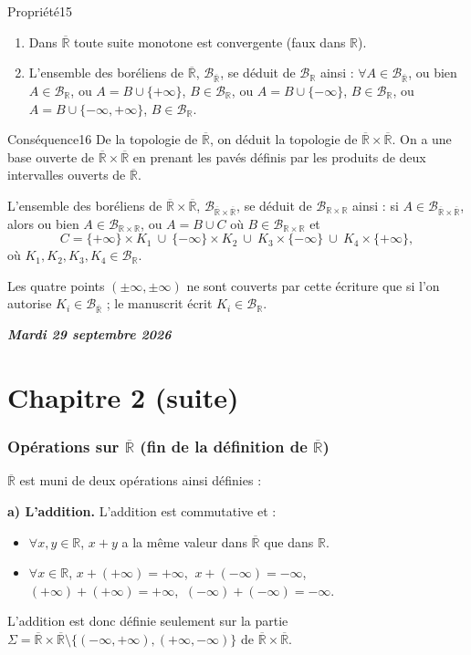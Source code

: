 \documentclass[11pt,a4paper]{article}
\newcommand{\R}{\mathbb{R}}
\newcommand{\Rb}{\overline{\mathbb{R}}}
\newcommand{\B}{\mathscr{B}}
\newcommand{\datepage}[1]{\begin{flushright}\small\bfseries\itshape\color{bleuclair}#1\end{flushright}\vspace{-8pt}}
\begin{document}
\begin{enonce}{Propriété}{15}
\begin{enumerate}[label=\textbf{\arabic*.},leftmargin=1.2cm]
  \item Dans $\Rb$ toute suite monotone est convergente (faux dans $\R$).
  \item L'ensemble des boréliens de $\Rb$, $\B_{\Rb}$, se déduit de $\B_{\R}$ ainsi : $\forall A\in\B_{\Rb}$,
        ou bien $A\in\B_{\R}$, ou $A=B\cup\{+\infty\}$, $B\in\B_{\R}$, ou $A=B\cup\{-\infty\}$, $B\in\B_{\R}$,
        ou $A=B\cup\{-\infty,+\infty\}$, $B\in\B_{\R}$.
\end{enumerate}
\end{enonce}

\begin{enonce}{Conséquence}{16}
De la topologie de $\Rb$, on déduit la topologie de $\Rb\times\Rb$.
On a une base ouverte de $\Rb\times\Rb$ en prenant les pavés définis par les produits de deux intervalles ouverts de $\Rb$.

L'ensemble des boréliens de $\Rb\times\Rb$, $\B_{\Rb\times\Rb}$, se déduit de $\B_{\R\times\R}$ ainsi :
si $A\in\B_{\Rb\times\Rb}$, alors ou bien $A\in\B_{\R\times\R}$, ou $A=B\cup C$ où $B\in\B_{\R\times\R}$ et
\[
  C=\{+\infty\}\times K_1\ \cup\ \{-\infty\}\times K_2\ \cup\ K_3\times\{-\infty\}\ \cup\ K_4\times\{+\infty\},
\]
où $K_1,K_2,K_3,K_4\in\B_{\R}$.
\end{enonce}

\begin{note}
Les quatre points $(\pm\infty,\pm\infty)$ ne sont couverts par cette écriture que si l'on autorise $K_i\in\B_{\Rb}$ ; le manuscrit écrit $K_i\in\B_{\R}$.
\end{note}

\newpage
\datepage{Mardi 29 septembre 2026}
\section*{Chapitre 2 (suite)}
\subsubsection*{Opérations sur $\Rb$ (fin de la définition de $\Rb$)}

$\Rb$ est muni de deux opérations ainsi définies :

\textbf{a) L'addition.} L'addition est commutative et :
\begin{itemize}[leftmargin=1.2cm]
  \item $\forall x,y\in\R$, $x+y$ a la même valeur dans $\Rb$ que dans $\R$.
  \item $\forall x\in\R$, $x+(+\infty)=+\infty$, $\ x+(-\infty)=-\infty$,\\
        $(+\infty)+(+\infty)=+\infty$, $\ (-\infty)+(-\infty)=-\infty$.
\end{itemize}
L'addition est donc définie seulement sur la partie
$\Sigma=\Rb\times\Rb\setminus\bigl\{(-\infty,+\infty),(+\infty,-\infty)\bigr\}$ de $\Rb\times\Rb$.
\end{document}
